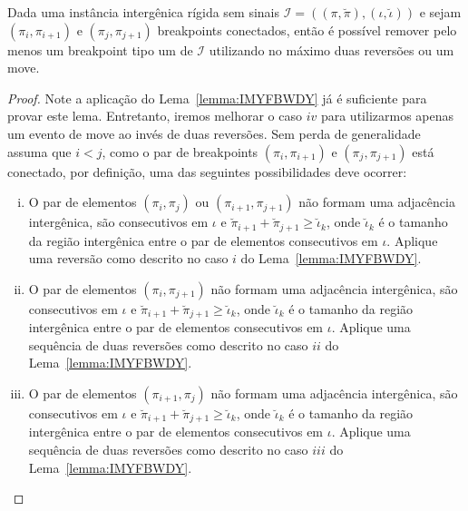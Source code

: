 \begin{lemma}\label{lemma:NWNNZGXH}
Dada uma instância intergênica rígida sem sinais $\mathcal{I}=((\pi,\breve\pi),(\iota,\breve\iota))$ e sejam $(\pi_i,\pi_{i+1})$ e $(\pi_j,\pi_{j+1})$ breakpoints conectados, então é possível remover pelo menos um breakpoint tipo um de $\mathcal{I}$ utilizando no máximo duas reversões ou um move.
\end{lemma}
\begin{proof}
Note a aplicação do Lema~\ref{lemma:IMYFBWDY} já é suficiente para provar este lema. Entretanto, iremos melhorar o caso $iv$ para utilizarmos apenas um evento de move ao invés de duas reversões. Sem perda de generalidade assuma que $i < j$, como o par de breakpoints $(\pi_i,\pi_{i+1})$ e $(\pi_j,\pi_{j+1})$ está conectado, por definição, uma das seguintes possibilidades deve ocorrer:
\begin{enumerate}[i.]
  \item O par de elementos $(\pi_i,\pi_{j})$ ou $(\pi_{i+1},\pi_{j+1})$ não formam uma adjacência intergênica, são consecutivos em $\iota$ e $\breve\pi_{i+1} + \breve\pi_{j+1} \ge \breve\iota_k$, onde $\breve\iota_k$ é o tamanho da região intergênica entre o par de elementos consecutivos em $\iota$. Aplique uma reversão como descrito no caso $i$ do Lema~\ref{lemma:IMYFBWDY}.   
  \item O par  de elementos $(\pi_i,\pi_{j+1})$ não formam uma adjacência intergênica, são consecutivos em $\iota$ e $\breve\pi_{i+1} + \breve\pi_{j+1} \ge \breve\iota_k$, onde $\breve\iota_k$ é o tamanho da região intergênica entre o par de elementos consecutivos em $\iota$. Aplique uma sequência de duas reversões como descrito no caso $ii$ do Lema~\ref{lemma:IMYFBWDY}.
  \item O par de elementos $(\pi_{i+1},\pi_{j})$ não formam uma adjacência intergênica, são consecutivos em $\iota$ e $\breve\pi_{i+1} + \breve\pi_{j+1} \ge \breve\iota_k$, onde $\breve\iota_k$ é o tamanho da região intergênica entre o par de elementos consecutivos em $\iota$. Aplique uma sequência de duas reversões como descrito no caso $iii$ do Lema~\ref{lemma:IMYFBWDY}.

\end{enumerate}
\end{proof}
